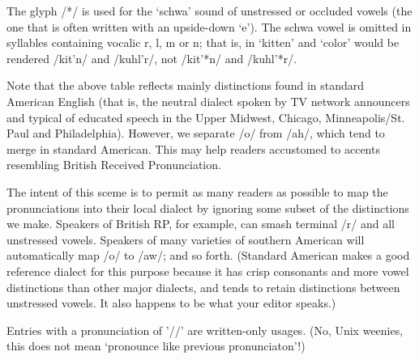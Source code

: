 The glyph /*/ is used for the `schwa' sound of unstressed or occluded vowels (the one that is often written with an upside-down `e'). The
schwa vowel is omitted in syllables containing vocalic r, l, m or n; that is, in `kitten' and `color' would be rendered /kit'n/ and
/kuhl'r/, not /kit'*n/ and /kuhl'*r/.

Note that the above table reflects mainly distinctions found in standard American English (that is, the neutral dialect spoken by TV
network announcers and typical of educated speech in the Upper Midwest, Chicago, Minneapolis/St. Paul and Philadelphia). However, we
separate /o/ from /ah/, which tend to merge in standard American. This may help readers accustomed to accents resembling British Received
Pronunciation.

The intent of this sceme is to permit as many readers as possible to map the pronunciations into their local dialect by ignoring some
subset of the distinctions we make. Speakers of British RP, for example, can smash terminal /r/ and all unstressed vowels. Speakers of many
varieties of southern American will automatically map /o/ to /aw/; and so forth. (Standard American makes a good reference dialect for this
purpose because it has crisp consonants and more vowel distinctions than other major dialects, and tends to retain distinctions between
unstressed vowels. It also happens to be what your editor speaks.)

Entries with a pronunciation of '//' are written-only usages. (No, Unix weenies, this does not mean `pronounce like previous
pronunciaton'!)

